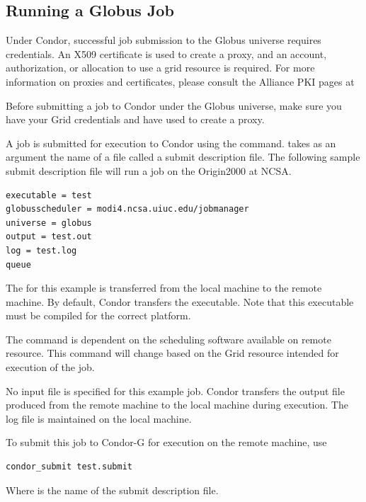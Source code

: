 \subsection{Running a Globus Job}

Under Condor, successful job submission to the Globus universe requires
credentials.
An X509 certificate is used to create a proxy,
and an account, authorization, or allocation to use a grid resource
is required.
For more information on proxies and certificates,
please consult the Alliance PKI pages at 


Before submitting a job to Condor under the Globus universe,
make sure you have your Grid 
credentials and have used  to create a proxy.

A job is submitted for execution to Condor using the
 command.
 takes as an argument the name of a file called a submit description file.
The following sample submit description file will run a job on
the Origin2000 at NCSA.

\begin{verbatim}
executable = test
globusscheduler = modi4.ncsa.uiuc.edu/jobmanager
universe = globus
output = test.out
log = test.log
queue
\end{verbatim} 

The 
for this example is
transferred from the local machine to the remote machine.
By default, Condor transfers the executable.
Note that this executable must be compiled for the correct
platform.

The  command is dependent on the
scheduling software available on remote resource.
This command will change based on the Grid resource
intended for execution of the job.

No input file is specified for this example job.
Condor transfers the output file produced 
from the remote machine to the local machine during execution.
The log file is maintained on the local machine.

To submit this job to Condor-G for execution on the
remote machine, use
\begin{verbatim}
condor_submit test.submit
\end{verbatim}
Where  is the name of the submit description file.

